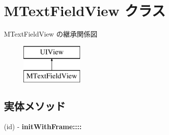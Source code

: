\hypertarget{interface_m_text_field_view}{}\section{M\+Text\+Field\+View クラス}
\label{interface_m_text_field_view}
M\+Text\+Field\+View の継承関係図\begin{figure}[H]
\begin{center}
\leavevmode
\includegraphics[height=2.000000cm]{interface_m_text_field_view}
\end{center}
\end{figure}
\subsection*{実体メソッド}
\begin{DoxyCompactItemize}
\item 
\hypertarget{interface_m_text_field_view_a57898fe26fed5f0ab9a6989ae31b57ca}{}(id) -\/ {\bfseries init\+With\+Frame\+::::}\label{interface_m_text_field_view_a57898fe26fed5f0ab9a6989ae31b57ca}

\end{DoxyCompactItemize}

